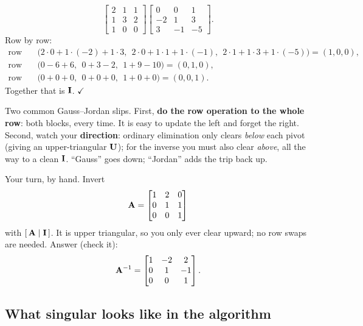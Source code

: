 \[
\begin{bmatrix} 2 & 1 & 1 \\ 1 & 3 & 2 \\ 1 & 0 & 0 \end{bmatrix}
\begin{bmatrix} 0 & 0 & 1 \\ -2 & 1 & 3 \\ 3 & -1 & -5 \end{bmatrix}.
\]
Row by row:
\begin{align*}
\text{row 1:}\quad & \bigl(2\cdot0 + 1\cdot(-2) + 1\cdot3,\ \ 2\cdot0 + 1\cdot1 + 1\cdot(-1),\ \
2\cdot1 + 1\cdot3 + 1\cdot(-5)\bigr) = (1,0,0),\\
\text{row 2:}\quad & \bigl(0 - 6 + 6,\ \ 0 + 3 - 2,\ \ 1 + 9 - 10\bigr) = (0,1,0),\\
\text{row 3:}\quad & \bigl(0 + 0 + 0,\ \ 0 + 0 + 0,\ \ 1 + 0 + 0\bigr) = (0,0,1).
\end{align*}
Together that is $\mathbf{I}$. $\checkmark$

\begin{trapbox}
Two common Gauss--Jordan slips. First, \textbf{do the row operation to the whole row}:
both blocks, every time. It is easy to update the left and forget the right.
Second, watch your \textbf{direction}: ordinary elimination only clears \emph{below} each
pivot (giving an upper-triangular $\mathbf{U}$); for the inverse you must also clear
\emph{above}, all the way to a clean $\mathbf{I}$. ``Gauss'' goes down; ``Jordan'' adds the
trip back up.
\end{trapbox}

\begin{labbox}
Your turn, by hand. Invert
\[
\mathbf{A} = \begin{bmatrix} 1 & 2 & 0 \\ 0 & 1 & 1 \\ 0 & 0 & 1 \end{bmatrix}
\]
with $[\,\mathbf{A}\mid\mathbf{I}\,]$. It is upper triangular, so you only ever
clear upward; no row swaps are needed. Answer (check it):
\[
\mathbf{A}^{-1} = \begin{bmatrix} 1 & -2 & 2 \\ 0 & 1 & -1 \\ 0 & 0 & 1 \end{bmatrix}.
\]
\end{labbox}

\subsection{What singular looks like in the algorithm}

